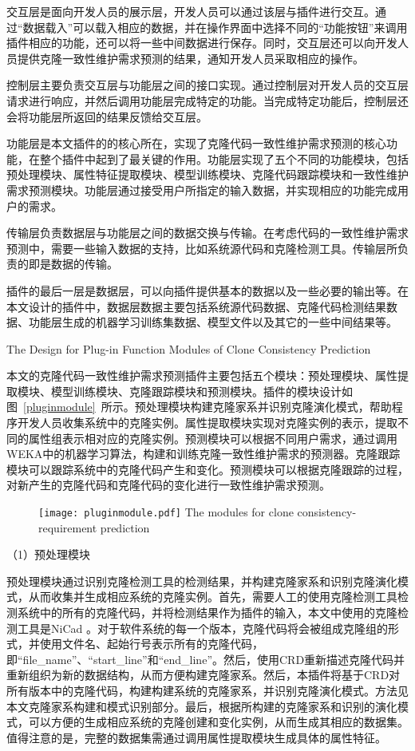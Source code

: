 交互层是面向开发人员的展示层，开发人员可以通过该层与插件进行交互。通过“数据载入”可以载入相应的数据，并在操作界面中选择不同的“功能按钮”来调用插件相应的功能，还可以将一些中间数据进行保存。同时，交互层还可以向开发人员提供克隆一致性维护需求预测的结果，通知开发人员采取相应的操作。

控制层主要负责交互层与功能层之间的接口实现。通过控制层对开发人员的交互层请求进行响应，并然后调用功能层完成特定的功能。当完成特定功能后，控制层还会将功能层所返回的结果反馈给交互层。

功能层是本文插件的的核心所在，实现了克隆代码一致性维护需求预测的核心功能，在整个插件中起到了最关键的作用。功能层实现了五个不同的功能模块，包括预处理模块、属性特征提取模块、模型训练模块、克隆代码跟踪模块和一致性维护需求预测模块。功能层通过接受用户所指定的输入数据，并实现相应的功能完成用户的需求。

传输层负责数据层与功能层之间的数据交换与传输。在考虑代码的一致性维护需求预测中，需要一些输入数据的支持，比如系统源代码和克隆检测工具。传输层所负责的即是数据的传输。

插件的最后一层是数据层，可以向插件提供基本的数据以及一些必要的输出等。在本文设计的插件中，数据层数据主要包括系统源代码数据、克隆代码检测结果数据、功能层生成的机器学习训练集数据、模型文件以及其它的一些中间结果等。

{The Design for Plug-in Function Modules of Clone Consistency Prediction}

本文的克隆代码一致性维护需求预测插件主要包括五个模块：预处理模块、属性提取模块、模型训练模块、克隆跟踪模块和预测模块。插件的模块设计如图~\ref{pluginmodule}~所示。预处理模块构建克隆家系并识别克隆演化模式，帮助程序开发人员收集系统中的克隆实例。属性提取模块实现对克隆实例的表示，提取不同的属性组表示相对应的克隆实例。预测模块可以根据不同用户需求，通过调用WEKA中的机器学习算法，构建和训练克隆一致性维护需求的预测器。克隆跟踪模块可以跟踪系统中的克隆代码产生和变化。预测模块可以根据克隆跟踪的过程，对新产生的克隆代码和克隆代码的变化进行一致性维护需求预测。

\begin{figure}[h]
\centering
\texttt{[image: pluginmodule.pdf]}
{The modules for clone consistency-requirement prediction}
\vspace{-1em}
\end{figure}

（1）预处理模块

预处理模块通过识别克隆检测工具的检测结果，并构建克隆家系和识别克隆演化模式，从而收集并生成相应系统的克隆实例。首先，需要人工的使用克隆检测工具检测系统中的所有的克隆代码，并将检测结果作为插件的输入，本文中使用的克隆检测工具是NiCad 。对于软件系统的每一个版本，克隆代码将会被组成克隆组的形式，并使用文件名、起始行号表示所有的克隆代码，即“{file\_name}”、“{start\_line}”和“{end\_line}”。然后，使用CRD重新描述克隆代码并重新组织为新的数据结构，从而方便构建克隆家系。然后，本插件将基于CRD对所有版本中的克隆代码，构建构建系统的克隆家系，并识别克隆演化模式。方法见本文克隆家系构建和模式识别部分。最后，根据所构建的克隆家系和识别的演化模式，可以方便的生成相应系统的克隆创建和变化实例，从而生成其相应的数据集。值得注意的是，完整的数据集需通过调用属性提取模块生成具体的属性特征。


